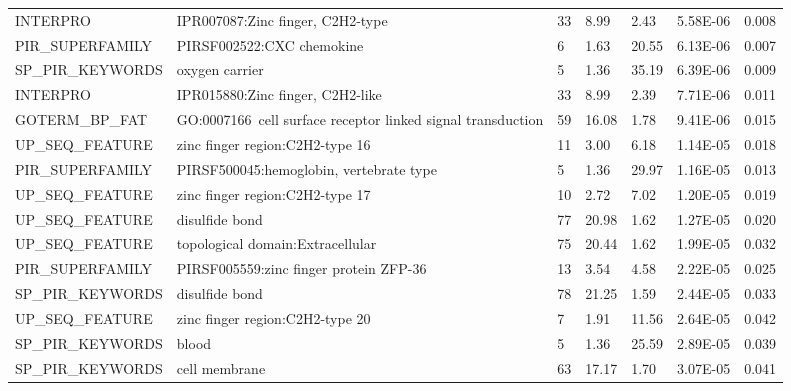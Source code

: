\documentclass[a4paper,11pt,oneside]{book}
\begin{document}
{\begin{longtable}{lllllll}
INTERPRO          & IPR007087:Zinc finger, C2H2-type                                & 33    & 8.99  & 2.43            & 5.58E-06 & 0.008    \\
PIR\_SUPERFAMILY  & PIRSF002522:CXC chemokine                                       & 6     & 1.63  & 20.55           & 6.13E-06 & 0.007    \\
SP\_PIR\_KEYWORDS & oxygen carrier                                                  & 5     & 1.36  & 35.19           & 6.39E-06 & 0.009    \\
INTERPRO          & IPR015880:Zinc finger, C2H2-like                                & 33    & 8.99  & 2.39            & 7.71E-06 & 0.011    \\
GOTERM\_BP\_FAT   & GO:0007166~cell surface receptor linked signal transduction     & 59    & 16.08 & 1.78            & 9.41E-06 & 0.015    \\
UP\_SEQ\_FEATURE  & zinc finger region:C2H2-type 16                                 & 11    & 3.00  & 6.18            & 1.14E-05 & 0.018    \\
PIR\_SUPERFAMILY  & PIRSF500045:hemoglobin, vertebrate type                         & 5     & 1.36  & 29.97           & 1.16E-05 & 0.013    \\
UP\_SEQ\_FEATURE  & zinc finger region:C2H2-type 17                                 & 10    & 2.72  & 7.02            & 1.20E-05 & 0.019    \\
UP\_SEQ\_FEATURE  & disulfide bond                                                  & 77    & 20.98 & 1.62            & 1.27E-05 & 0.020    \\
UP\_SEQ\_FEATURE  & topological domain:Extracellular                                & 75    & 20.44 & 1.62            & 1.99E-05 & 0.032    \\
PIR\_SUPERFAMILY  & PIRSF005559:zinc finger protein ZFP-36                          & 13    & 3.54  & 4.58            & 2.22E-05 & 0.025    \\
SP\_PIR\_KEYWORDS & disulfide bond                                                  & 78    & 21.25 & 1.59            & 2.44E-05 & 0.033    \\
UP\_SEQ\_FEATURE  & zinc finger region:C2H2-type 20                                 & 7     & 1.91  & 11.56           & 2.64E-05 & 0.042    \\
SP\_PIR\_KEYWORDS & blood                                                           & 5     & 1.36  & 25.59           & 2.89E-05 & 0.039    \\
SP\_PIR\_KEYWORDS & cell membrane                                                   & 63    & 17.17 & 1.70            & 3.07E-05 & 0.041   

\end{longtable}
}

\restoregeometry




\ifstandalone
\begin{small}

\end{small}
\fi
\end{document}
